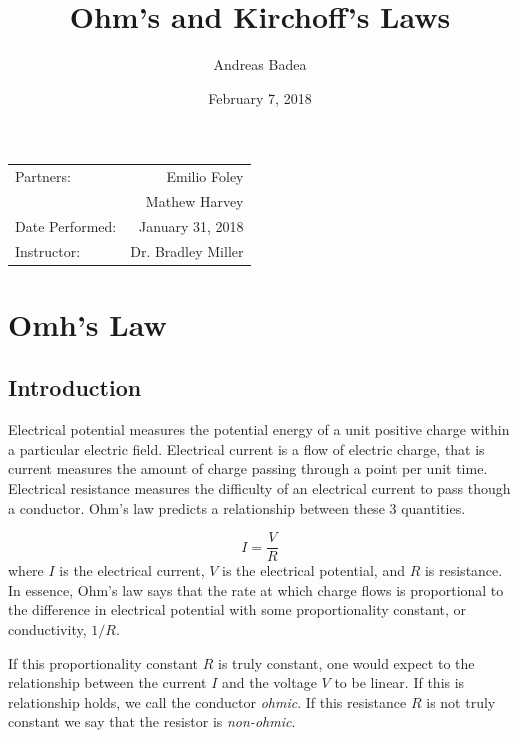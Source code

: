 \documentclass[11pt]{article}
\title{Ohm's and Kirchoff's Laws}
\author{Andreas Badea}
\date{February 7, 2018}
\begin{document}
\maketitle
\begin{center}
	\begin{tabular}{l r}
		Partners: & Emilio Foley \\
		& Mathew Harvey \\
		Date Performed: & January 31, 2018 \\ %
		Instructor: & Dr. Bradley Miller %
	\end{tabular}
\end{center}

\section{Omh's Law}
\subsection{Introduction}
Electrical potential measures the potential energy of a unit positive charge within a particular electric field. Electrical current is a flow of electric charge, that is current measures the amount of charge passing through a point per unit time. Electrical resistance measures the difficulty of an electrical current to pass though a conductor. Ohm's law predicts a relationship between these 3 quantities.

\begin{equation}
I = \frac{V}{R}
\end{equation}
where \(I\) is the electrical current, \(V\) is the electrical potential, and \(R\) is resistance. In essence, Ohm's law says that the rate at which charge flows is proportional to the difference in electrical potential with some proportionality constant, or conductivity, \(1/R\).

If this proportionality constant \(R\) is truly constant, one would expect to the relationship between the current \(I\) and the voltage \(V\) to be linear. If this is relationship holds, we call the conductor \textit{ohmic}. If this resistance \(R\) is not truly constant we say that the resistor is \textit{non-ohmic}.
\end{document}
